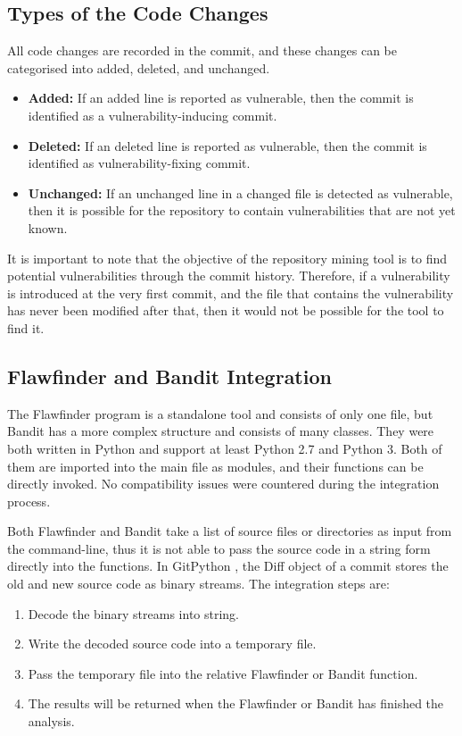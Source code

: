 \documentclass[12pt, a4paper]{report}
\begin{document}
\subsection{Types of the Code Changes}
All code changes are recorded in the commit, and these changes can be categorised into added,
deleted, and unchanged.
\begin{itemize}
  \item \textbf{Added:} If an added line is reported as vulnerable, then the commit is identified as
  a vulnerability-inducing commit.
  \item \textbf{Deleted:} If an deleted line is reported as vulnerable, then the commit is
  identified as vulnerability-fixing commit.
  \item \textbf{Unchanged:} If an unchanged line in a changed file is detected as vulnerable, then
  it is possible for the repository to contain vulnerabilities that are not yet known.
\end{itemize}

It is important to note that the objective of the repository mining tool is to find potential
vulnerabilities through the commit history. Therefore, if a vulnerability is introduced at the very
first commit, and the file that contains the vulnerability has never been modified after that, then
it would not be possible for the tool to find it.

\subsection{Flawfinder and Bandit Integration} \label{subsec:flawfinder_bandit}
The Flawfinder program is a standalone tool and consists of only one file, but Bandit has a more
complex structure and consists of many classes. They were both written in Python and support at
least Python 2.7 and Python 3. Both of them are imported into the main file as modules, and their
functions can be directly invoked. No compatibility issues were countered during the integration
process.

Both Flawfinder and Bandit take a list of source files or directories as input from the
command-line, thus it is not able to pass the source code in a string form directly into the
functions. In GitPython \cite{gitpython}, the Diff object of a commit stores the old and new source
code as binary streams. The integration steps are:
\begin{enumerate}
  \item Decode the binary streams into string.
  \item Write the decoded source code into a temporary file.
  \item Pass the temporary file into the relative Flawfinder or Bandit function.
  \item The results will be returned when the Flawfinder or Bandit has finished the analysis.
\end{enumerate}
\end{document}
